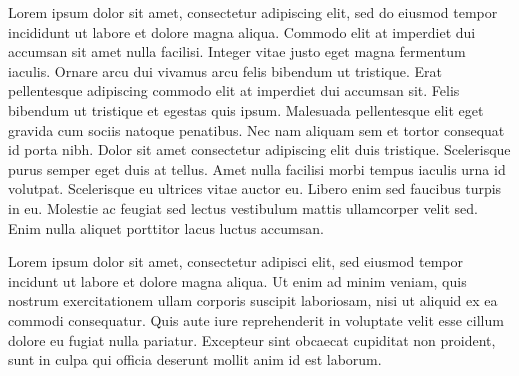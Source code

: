 Lorem ipsum dolor sit amet, consectetur adipiscing elit, sed do eiusmod tempor
incididunt ut labore et dolore magna aliqua. Commodo elit at imperdiet dui
accumsan sit amet nulla facilisi. Integer vitae justo eget magna fermentum
iaculis. Ornare arcu dui vivamus arcu felis bibendum ut tristique. Erat
pellentesque adipiscing commodo elit at imperdiet dui accumsan sit. Felis
bibendum ut tristique et egestas quis ipsum. Malesuada pellentesque elit eget
gravida cum sociis natoque penatibus. Nec nam aliquam sem et tortor consequat
id porta nibh. Dolor sit amet consectetur adipiscing elit duis tristique.
Scelerisque purus semper eget duis at tellus. Amet nulla facilisi morbi tempus
iaculis urna id volutpat. Scelerisque eu ultrices vitae auctor eu. Libero enim
sed faucibus turpis in eu. Molestie ac feugiat sed lectus vestibulum mattis
ullamcorper velit sed. Enim nulla aliquet porttitor lacus luctus accumsan.

Lorem ipsum dolor sit amet, consectetur adipisci elit, sed eiusmod tempor
incidunt ut labore et dolore magna aliqua. Ut enim ad minim veniam, quis
nostrum exercitationem ullam corporis suscipit laboriosam, nisi ut aliquid ex
ea commodi consequatur. Quis aute iure reprehenderit in voluptate velit esse
cillum dolore eu fugiat nulla pariatur. Excepteur sint obcaecat cupiditat non
proident, sunt in culpa qui officia deserunt mollit anim id est laborum.
